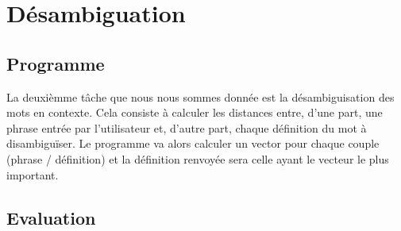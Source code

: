 \section{Désambiguation}
\subsection{Programme}

La deuxièmme tâche que nous nous sommes donnée est la désambiguisation des mots
en contexte. Cela consiste à calculer les distances entre, d'une part, une
phrase entrée par l'utilisateur et, d'autre part, chaque définition du mot à
disambiguïser. Le programme va alors calculer un vector pour chaque couple
(phrase / définition) et la définition renvoyée sera celle ayant le vecteur le
plus important. 

\subsection{Evaluation}
